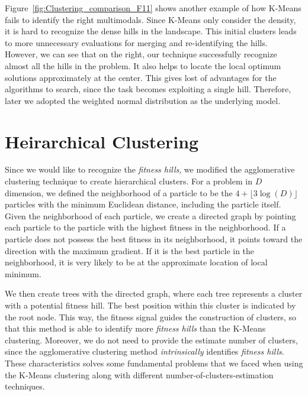 Figure~\ref{fig:Clustering_comparison_F11} shows another example of how K-Means fails to identify the right multimodals.
Since K-Means only consider the density, it is hard to recognize the dense hills in the landscape. 
This initial clusters leads to more unnecessary evaluations for merging and re-identifying the hills.
However, we can see that on the right, our technique successfully recognize almost all the hills in the problem.
It also helps to locate the local optimum solutions approximately at the center.
This gives lost of advantages for the algorithms to search, since the task becomes exploiting a single hill.
Therefore, later we adopted the weighted normal distribution as the underlying model. 


\section{Heirarchical Clustering}\label{section:hierarchical}

Since we would like to recognize the \textit{fitness hills}, 
we modified the agglomerative clustering technique to create hierarchical clusters.
For a problem in $D$ dimension, we defined the neighborhood of a particle 
to be the $ 4 + \lfloor 3\log(D) \rfloor $ particles with the minimum Euclidean distance, including the particle itself.
Given the neighborhood of each particle, 
we create a directed graph by pointing each particle to the particle with the highest fitness in the neighborhood.
If a particle does not possess the best fitness in its neighborhood, it points toward the direction with the maximum gradient.
If it is the best particle in the neighborhood, it is very likely to be at the approximate location of local minimum.

We then create trees with the directed graph, 
where each tree represents a cluster with a potential fitness hill.
The best position within this cluster is indicated by the root node.  
This way, the fitness signal guides the construction of clusters, 
so that this method is able to identify more \textit{fitness hills} than the K-Means clustering.
Moreover, we do not need to provide the estimate number of clusters, 
since the agglomerative clustering method \textit{intrinsically} identifies \textit{fitness hills}.
These characteristics solves some fundamental problems that we faced when using the K-Means clustering along with different number-of-clusters-estimation techniques.

